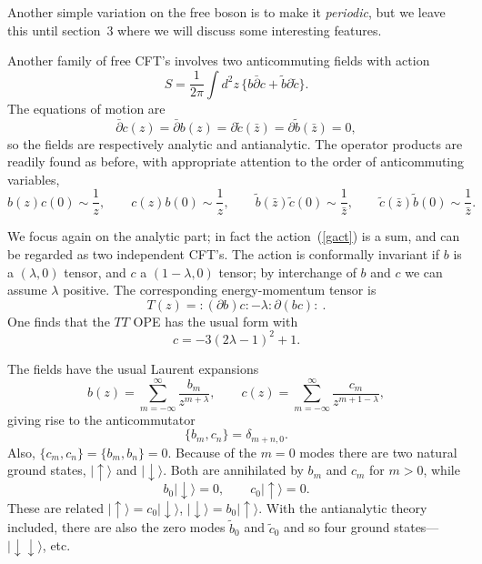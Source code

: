 Another simple variation on the free boson is to make it {\it
periodic}, but we leave this until section~3 where we will discuss
some interesting features.

Another family of free CFT's involves two anticommuting fields
with action
\begin{equation}
S = \frac{1}{2\pi} \int d^2z \, 
\{ b \bar\partial c + \tilde{b} \partial \tilde{c} \}. \label{gact}
\end{equation}
The equations of motion are
\begin{equation}
\bar\partial c(z) = \bar\partial b(z) = 
\partial \tilde{c} (\bar z) = \partial \tilde{b} (\bar z) = 0,
\end{equation}
so the fields are respectively analytic and antianalytic.
The operator products are readily found as before, with appropriate
attention to the order of anticommuting variables,
\begin{equation}
b(z)c(0) \sim \frac{1}{z}, \qquad 
c(z)b(0) \sim \frac{1}{z}, \qquad 
\tilde b(\bar z)\tilde c(0) \sim \frac{1}{\bar z},
\qquad 
\tilde c(\bar z)\tilde b(0) \sim \frac{1}{\bar z}.
\end{equation}

We focus again on the analytic part; in fact the
action~(\ref{gact}) is a sum, and can be regarded as two
independent CFT's.  The action is conformally invariant if
$b$ is a $(\lambda, 0)$ tensor, and $c$ a $(1-\lambda, 0)$
tensor; by interchange of $b$ and $c$ we can assume $\lambda$
positive.  The corresponding energy-momentum tensor is
\begin{equation}
T(z) = :\! (\partial b) c  \! : - \lambda :\!  \partial( bc ) \! :\ .
\end{equation}
One finds that the $TT$ OPE has the usual form with
\begin{equation}
c = - 3(2 \lambda - 1)^2 + 1.  \label{bccc}
\end{equation}

The fields have the usual Laurent expansions
\begin{equation}
b(z) = \sum_{m=-\infty}^{\infty} \frac{b_m}{z^{m+\lambda}}, \qquad
c(z) = \sum_{m=-\infty}^{\infty}
\frac{c_m}{z^{m+1-\lambda}},
\label{bclaur}
\end{equation}
giving rise to the anticommutator
\begin{equation}
\{ b_m, c_n \} = \delta_{m+n,0}.
\end{equation}
Also, $\{ c_m, c_n \} = \{ b_m, b_n \} = 0$.
Because of the $m=0$ modes there are two natural ground states, 
$|\!\uparrow\rangle$ and 
$| \!\downarrow \rangle$.  Both are annihilated by $b_m$ and
$c_m$ for $m > 0$, while
\begin{equation}
b_0 | \!\downarrow \rangle = 0, \qquad c_0 |\!\uparrow\rangle = 0.
\label{ghvac}
\end{equation}
These are related $ |\!\uparrow\rangle = c_0  |\! \downarrow
\rangle$,
$ |\! \downarrow \rangle = b_0 |\!\uparrow\rangle$.  With the
antianalytic theory included, there are also the zero modes
$\tilde b_0$ and $\tilde c_0$ and so four ground
states---$|\!\downarrow\downarrow\rangle$, etc.

